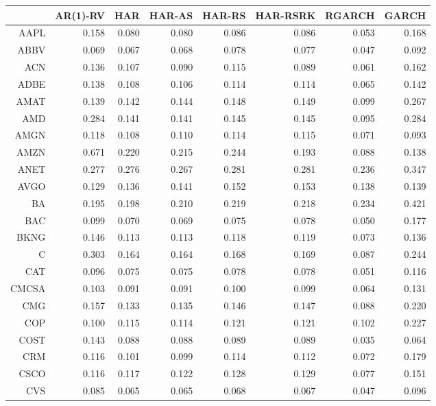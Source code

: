 \begin{table}[ht]
\centering
\begin{tabular}{rrrrrrrr}
  \hline
 & AR(1)-RV & HAR & HAR-AS & HAR-RS & HAR-RSRK & RGARCH & GARCH \\ 
  \hline
AAPL & 0.158 & 0.080 & 0.080 & 0.086 & 0.086 & 0.053 & 0.168 \\ 
  ABBV & 0.069 & 0.067 & 0.068 & 0.078 & 0.077 & 0.047 & 0.092 \\ 
  ACN & 0.136 & 0.107 & 0.090 & 0.115 & 0.089 & 0.061 & 0.162 \\ 
  ADBE & 0.138 & 0.108 & 0.106 & 0.114 & 0.114 & 0.065 & 0.142 \\ 
  AMAT & 0.139 & 0.142 & 0.144 & 0.148 & 0.149 & 0.099 & 0.267 \\ 
  AMD & 0.284 & 0.141 & 0.141 & 0.145 & 0.145 & 0.095 & 0.284 \\ 
  AMGN & 0.118 & 0.108 & 0.110 & 0.114 & 0.115 & 0.071 & 0.093 \\ 
  AMZN & 0.671 & 0.220 & 0.215 & 0.244 & 0.193 & 0.088 & 0.138 \\ 
  ANET & 0.277 & 0.276 & 0.267 & 0.281 & 0.281 & 0.236 & 0.347 \\ 
  AVGO & 0.129 & 0.136 & 0.141 & 0.152 & 0.153 & 0.138 & 0.139 \\ 
  BA & 0.195 & 0.198 & 0.210 & 0.219 & 0.218 & 0.234 & 0.421 \\ 
  BAC & 0.099 & 0.070 & 0.069 & 0.075 & 0.078 & 0.050 & 0.177 \\ 
  BKNG & 0.146 & 0.113 & 0.113 & 0.118 & 0.119 & 0.073 & 0.136 \\ 
  C & 0.303 & 0.164 & 0.164 & 0.168 & 0.169 & 0.087 & 0.244 \\ 
  CAT & 0.096 & 0.075 & 0.075 & 0.078 & 0.078 & 0.051 & 0.116 \\ 
  CMCSA & 0.103 & 0.091 & 0.091 & 0.100 & 0.099 & 0.064 & 0.131 \\ 
  CMG & 0.157 & 0.133 & 0.135 & 0.146 & 0.147 & 0.088 & 0.220 \\ 
  COP & 0.100 & 0.115 & 0.114 & 0.121 & 0.121 & 0.102 & 0.227 \\ 
  COST & 0.143 & 0.088 & 0.088 & 0.089 & 0.089 & 0.035 & 0.064 \\ 
  CRM & 0.116 & 0.101 & 0.099 & 0.114 & 0.112 & 0.072 & 0.179 \\ 
  CSCO & 0.116 & 0.117 & 0.122 & 0.128 & 0.129 & 0.077 & 0.151 \\ 
  CVS & 0.085 & 0.065 & 0.065 & 0.068 & 0.067 & 0.047 & 0.096 \\ 

\end{tabular}
\end{table}
